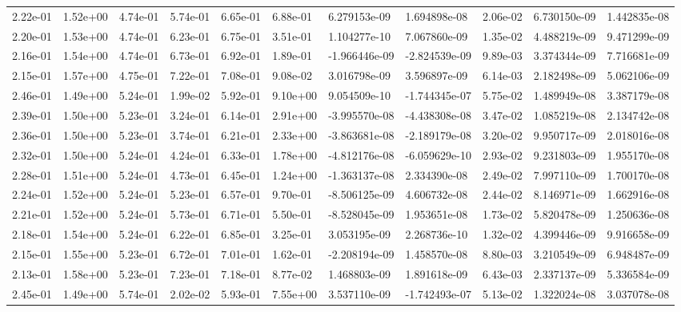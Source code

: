 \begin{longtable}{| p{} | p{} |}
2.22e-01 & 1.52e+00 & 4.74e-01 & 5.74e-01 & 6.65e-01 & 6.88e-01 &  6.279153e-09 &  1.694898e-08 &  2.06e-02 &  6.730150e-09 &  1.442835e-08 \\
2.20e-01 & 1.53e+00 & 4.74e-01 & 6.23e-01 & 6.75e-01 & 3.51e-01 &  1.104277e-10 &  7.067860e-09 &  1.35e-02 &  4.488219e-09 &  9.471299e-09 \\
2.16e-01 & 1.54e+00 & 4.74e-01 & 6.73e-01 & 6.92e-01 & 1.89e-01 & -1.966446e-09 & -2.824539e-09 &  9.89e-03 &  3.374344e-09 &  7.716681e-09 \\
2.15e-01 & 1.57e+00 & 4.75e-01 & 7.22e-01 & 7.08e-01 & 9.08e-02 &  3.016798e-09 &  3.596897e-09 &  6.14e-03 &  2.182498e-09 &  5.062106e-09 \\
2.46e-01 & 1.49e+00 & 5.24e-01 & 1.99e-02 & 5.92e-01 & 9.10e+00 &  9.054509e-10 & -1.744345e-07 &  5.75e-02 &  1.489949e-08 &  3.387179e-08 \\
2.39e-01 & 1.50e+00 & 5.23e-01 & 3.24e-01 & 6.14e-01 & 2.91e+00 & -3.995570e-08 & -4.438308e-08 &  3.47e-02 &  1.085219e-08 &  2.134742e-08 \\
2.36e-01 & 1.50e+00 & 5.23e-01 & 3.74e-01 & 6.21e-01 & 2.33e+00 & -3.863681e-08 & -2.189179e-08 &  3.20e-02 &  9.950717e-09 &  2.018016e-08 \\
2.32e-01 & 1.50e+00 & 5.24e-01 & 4.24e-01 & 6.33e-01 & 1.78e+00 & -4.812176e-08 & -6.059629e-10 &  2.93e-02 &  9.231803e-09 &  1.955170e-08 \\
2.28e-01 & 1.51e+00 & 5.24e-01 & 4.73e-01 & 6.45e-01 & 1.24e+00 & -1.363137e-08 &  2.334390e-08 &  2.49e-02 &  7.997110e-09 &  1.700170e-08 \\
2.24e-01 & 1.52e+00 & 5.24e-01 & 5.23e-01 & 6.57e-01 & 9.70e-01 & -8.506125e-09 &  4.606732e-08 &  2.44e-02 &  8.146971e-09 &  1.662916e-08 \\
2.21e-01 & 1.52e+00 & 5.24e-01 & 5.73e-01 & 6.71e-01 & 5.50e-01 & -8.528045e-09 &  1.953651e-08 &  1.73e-02 &  5.820478e-09 &  1.250636e-08 \\
2.18e-01 & 1.54e+00 & 5.24e-01 & 6.22e-01 & 6.85e-01 & 3.25e-01 &  3.053195e-09 &  2.268736e-10 &  1.32e-02 &  4.399446e-09 &  9.916658e-09 \\
2.15e-01 & 1.55e+00 & 5.23e-01 & 6.72e-01 & 7.01e-01 & 1.62e-01 & -2.208194e-09 &  1.458570e-08 &  8.80e-03 &  3.210549e-09 &  6.948487e-09 \\
2.13e-01 & 1.58e+00 & 5.23e-01 & 7.23e-01 & 7.18e-01 & 8.77e-02 &  1.468803e-09 &  1.891618e-09 &  6.43e-03 &  2.337137e-09 &  5.336584e-09 \\
2.45e-01 & 1.49e+00 & 5.74e-01 & 2.02e-02 & 5.93e-01 & 7.55e+00 &  3.537110e-09 & -1.742493e-07 &  5.13e-02 &  1.322024e-08 &  3.037078e-08 \\

\end{longtable}
